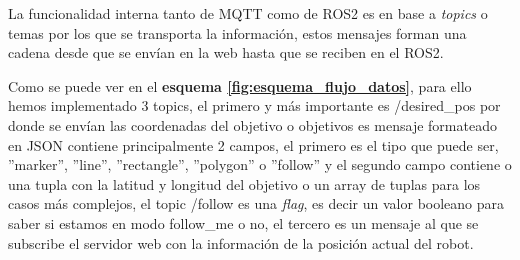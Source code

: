 La funcionalidad interna tanto de MQTT como de ROS2 es en base a \textit{topics} o temas por los que se transporta la información, estos 
mensajes forman una cadena desde que se envían en la web hasta que se reciben en el ROS2.

Como se puede ver en el \textbf{esquema \ref{fig:esquema_flujo_datos}}, para ello hemos implementado 3 topics, el primero y más importante 
es /desired\_pos por donde se envían las coordenadas del objetivo o objetivos es mensaje formateado en JSON contiene principalmente 2 
campos, el primero es el tipo que puede ser, ''marker'', ''line'', ''rectangle'', ''polygon'' o ''follow'' y el segundo campo contiene o 
una tupla con la latitud y longitud del objetivo o un array de tuplas para los casos más complejos, el topic /follow es una \textit{flag}, 
es decir un valor booleano para saber si estamos en modo follow\_me o no, el tercero es un mensaje al que se subscribe el servidor web con 
la información de la posición actual del robot.

